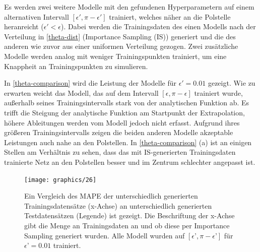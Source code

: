 Es werden zwei weitere Modelle mit den gefundenen Hyperparametern auf einem alternativen Intervall $[\epsilon', \pi-\epsilon']$ trainiert, welches näher an die Polstelle heranreicht ($\epsilon' < \epsilon$).  Dabei werden die Trainingsdaten des einen Modells nach der Verteilung in \textsf{\autoref{theta-dist}} (Importance Sampling (IS)) generiert und die des anderen wie zuvor aus einer uniformen Verteilung gezogen. Zwei zusätzliche Modelle werden analog mit weniger Trainingspunkten trainiert, um eine Knappheit an Trainingspunkten zu simulieren. 

In \textsf{\autoref{theta-comparison}} wird die Leistung der Modelle für $\epsilon' = 0.01$ gezeigt. Wie zu erwarten weicht das Modell, das auf dem Intervall $[\epsilon, \pi-\epsilon]$ trainiert wurde, außerhalb seines Trainingsintervalls stark von der analytischen Funktion ab. Es trifft die Steigung der analytische Funktion am Startpunkt der Extrapolation, höhere Ableitungen werden vom Modell jedoch nicht erfasst. Aufgrund ihres größeren Trainingsintervalls zeigen die beiden anderen Modelle akzeptable Leistungen auch nahe an den Polstellen. In \textsf{\autoref{theta-comparison} (a)} ist an einigen Stellen am Verhältnis zu sehen, dass das mit IS-generierten Trainingsdaten trainierte Netz an den Polstellen besser und im Zentrum schlechter angepasst ist.
\begin{figure}
	\centering
	\captionsetup{
		format=plain,
		margin=0.5em,
		labelsep=newline,
		justification=justified,
		singlelinecheck=false
	}
	{\caption{Ein Vergleich des MAPE der unterschiedlich generierten Trainingsdatensätze (x-Achse) an unterschiedlich generierten Testdatensätzen (Legende) ist gezeigt. Die Beschriftung der x-Achse gibt die Menge an Trainingsdaten an und ob diese per Importance Sampling generiert wurden. Alle Modell wurden auf ${[\epsilon’, \pi - \epsilon’]}$ für $\epsilon’=0.01$ trainiert.}\label{MAPE-comp-theta-modelle}}
	{\texttt{[image: graphics/26]}}
\end{figure}
